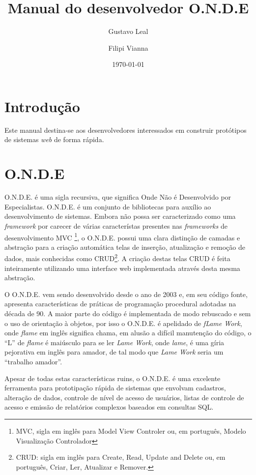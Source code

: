 \documentclass[9pt]{report}
\title{Manual do desenvolvedor O.N.D.E}
\author{
  Gustavo Leal
  \and
  Filipi Vianna
}
\date{\today}
\begin{document}
  \maketitle

  \tableofcontents

  \listoffigures

 \chapter{Introdução}
  
 Este manual destina-se aos desenvolvedores interessados em
 construir protótipos de sistemas \textit{web} de forma rápida.
    
   \chapter{O.N.D.E}
   
   O.N.D.E. é uma sigla recursiva, que significa Onde Não é Desenvolvido
   por Especialistas. O.N.D.E. é um conjunto de bibliotecas para auxílio
   ao desenvolvimento de sistemas. Embora não possa ser caracterizado como
   uma \textit{framework} por carecer de várias característas presentes
   nas \textit{frameworks} de desenvolvimento MVC \footnote{MVC, sigla em
   inglês para Model View Controler  ou, em português, Modelo Visualização
   Controlador}, o O.N.D.E. possui uma clara distinção de
   camadas e abstração para a criação automática telas de inserção,
   atualização e remoção de dados, mais conhecidas como
   CRUD\footnote{CRUD: sigla em inglês para Create, Read, Update
     and Delete ou, em português, Criar, Ler, Atualizar e Remover.}.
   A criação destas telas CRUD é feita inteiramente utilizando uma
   interface web implementada através desta mesma abstração.
   
   O O.N.D.E. vem sendo desenvolvido desde o ano de 2003 e, em seu código
   fonte, apresenta características de práticas de programação procedural
   adotadas na década de 90. A maior parte do código é implementada
   de modo rebuscado e sem o uso de orientação à objetos, por isso
   o O.N.D.E. é apelidado de \textit{fLame Work}, onde \textit{flame}
   em inglês significa chama, em alusão a difícil manutenção do código,
   o ``L'' de \textit{flame} é maiúsculo para se ler \textit{Lame Work},
   onde \textit{lame}, é uma gíria pejorativa em inglês para amador,
   de tal modo que \textit{Lame Work} seria um ``trabalho amador''.

   Apesar de todas estas características ruins, o O.N.D.E. é uma
   excelente ferramenta para prototipação rápida de sistemas que
   envolvam cadastros, alteração de dados, controle de nível de
   acesso de usuários, listas de controle de acesso e emissão de
   relatórios complexos baseados em consultas SQL.
   
\end{document}
